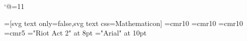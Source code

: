 \catcode`@=11\relax





\ifHtml
	
	=[svg text only=false,svg text css=Mathematicon]%
	\font\LD@Font@Tiny=cmr10\relax
	\font\LD@Font@Inferno=cmr10\relax
	\font\LD@Font@Arial=cmr10\relax
\else
	\LD@AFour@Book
	\font\LD@Font@Tiny=cmr5\relax
	\font\LD@Font@Inferno="Riot Act 2" at 8pt\relax
	\font\LD@Font@Arial="Arial" at 10pt\relax
\fi





\newcount\LD@Count@Temp


\newif\ifLD@Inferno@Master@\LD@Inferno@Master@true
\LD@Exo@Label@Show



\def\LD@Exercice@Display@Code{}%
\gdef\LD@Exercice@Solution@List{}%
\gdef\LD@Exercice@Indication@List{}%
\gdef\LD@Exercice@Notion@List{}%
\def\LD@Exercice@Display@Code@Post{%
	\ifcsname LD@Exo@@Solution\endcsname
		\unless\ifx\LD@Exo@@Solution\LD@Empty
			\ifLD@Inferno@Master@
				\pn{\eightpts Solution : \eightpts \LD@Exo@@Solution}%
			\else
				\ifx\LD@Exercice@Solution@List\LD@Empty
					\EA\gdef\EA\LD@Exercice@Solution@List\EA{\LD@Option@@Label}%
				\else
					\EA\EA\EA\gdef\EA\EA\EA\LD@Exercice@Solution@List\EA\EA\EA{\EA\LD@Exercice@Solution@List\EA ,\LD@Option@@Label}%
				\fi
			\fi
		\fi
	\fi
	\ifcsname LD@Exo@@Notion\endcsname
		\unless\ifx\LD@Exo@@Notion\LD@Empty
			\ifLD@Inferno@Master@
				\pn{\eightpts Notions intervenant dans la solution : \eightpts \LD@Exo@@Notion}%
			\else
				\ifx\LD@Exercice@Notion@List\LD@Empty
					\EA\gdef\EA\LD@Exercice@Notion@List\EA{\LD@Option@@Label}%
				\else
					\EA\EA\EA\gdef\EA\EA\EA\LD@Exercice@Notion@List\EA\EA\EA{\EA\LD@Exercice@Notion@List\EA ,\LD@Option@@Label}%
				\fi
			\fi	
		\fi
	\fi
	\ifcsname LD@Exo@@Indication\endcsname
		\unless\ifx\LD@Exo@@Indication\LD@Empty
			\ifLD@Inferno@Master@
				\pn{\eightpts Indication : \eightpts \LD@Exo@@Indication}%
			\else
				\ifx\LD@Exercice@Indication@List\LD@Empty
					\EA\gdef\EA\LD@Exercice@Indication@List\EA{\LD@Option@@Label}%
					\else
					\EA\EA\EA\gdef\EA\EA\EA\LD@Exercice@Indication@List\EA\EA\EA{\EA\LD@Exercice@Indication@List\EA ,\LD@Option@@Label}%
				\fi
			\fi
		\fi
	\fi
	\medskip\penalty-100
}%
\def\LD@Display#1{%
	\LD@Count@Temp=#1\relax
	\ifcase\LD@Count@Temp
	\or
	Math. Sup.
	\or
	Math. Sp\'e
	\else
	\fi
}%

